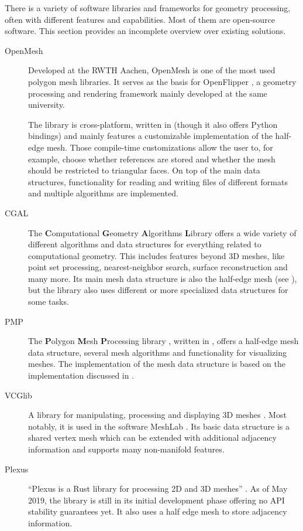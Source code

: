 There is a variety of software libraries and frameworks for geometry processing, often with different features and capabilities.
Most of them are open-source software.
This section provides an incomplete overview over existing solutions.

\begin{description}
  \item [OpenMesh] Developed at the RWTH Aachen, OpenMesh \cite{botsch2002openmesh,openmeshhomepage} is one of the most used polygon mesh libraries.
  It serves as the basis for OpenFlipper \cite{mobius2010openflipper, openflipperhomepage}, a geometry processing and rendering framework mainly developed at the same university.

  The library is cross-platform, written in \cpp (though it also offers Python bindings) and mainly features a customizable implementation of the half-edge mesh.
  Those compile-time customizations allow the user to, for example, choose whether  references are stored and whether the mesh should be restricted to triangular faces.
  On top of the main data structures, functionality for reading and writing files of different formats and multiple algorithms are implemented.

  \item [CGAL] The \textbf{C}omputational \textbf{G}eometry \textbf{A}lgorithms \textbf{L}ibrary \cite{cgalhomepage} offers a wide variety of different algorithms and data structures for everything related to computational geometry.
  This includes features beyond 3D meshes, like point set processing, nearest-neighbor search, surface reconstruction and many more.
  Its main mesh data structure is also the half-edge mesh (see \cite{cgal:k-hds-19a, cgal:bsmf-sm-19a}), but the library also uses different or more specialized data structures for some tasks.

  \item [PMP] The \textbf{P}olygon \textbf{M}esh \textbf{P}rocessing library \cite{pmp-library}, written in \cpp, offers a half-edge mesh data structure, several mesh algorithms and functionality for visualizing meshes.
  The implementation of the mesh data structure is based on the  implementation discussed in \cite{sieger2011design}.

  \item [VCGlib] A \cpp library for manipulating, processing and displaying 3D meshes \cite{vcglibhomepage}.
  Most notably, it is used in the software MeshLab \cite{meshlabhomepage}.
  Its basic data structure is a shared vertex mesh which can be extended with additional adjacency information and supports many non-manifold features.

  \item [Plexus] \enquote{Plexus is a Rust library for processing 2D and 3D meshes} \cite{plexus}.
  As of May 2019, the library is still in its initial development phase offering no API stability guarantees yet.
  It also uses a half edge mesh to store adjacency information.
\end{description}


\setlength{\tabcolsep}{\origtabcolsep}

